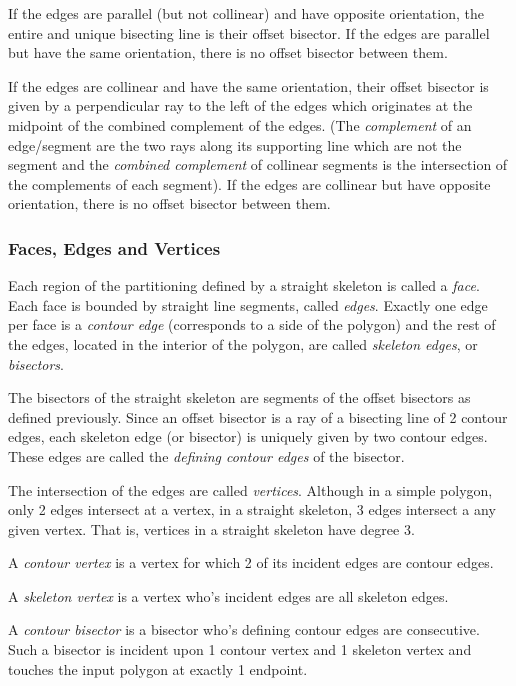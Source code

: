 If the edges are parallel (but not collinear) and have opposite
orientation, the entire and unique bisecting line is their offset
bisector. If the edges are parallel but have the same orientation,
there is no offset bisector between them.

If the edges are collinear and have the same orientation, their offset
bisector is given by a perpendicular ray to the left of the edges
which originates at the midpoint of the combined complement of
the edges. (The {\em complement} of an edge/segment are the two
rays along its supporting line which are not the segment and the
{\em combined complement} of  collinear segments is the
intersection of the complements of each segment). If the edges are
collinear but have opposite orientation, there is no offset bisector
between them.


\subsubsection{Faces, Edges and Vertices}

Each region of the partitioning defined by a straight skeleton is
called a {\em face}. Each face is bounded by straight line segments,
called {\em edges}. Exactly one edge per face is a {\em contour edge}
(corresponds to a side of the polygon) and the rest of the edges,
located in the interior of the polygon, are called {\em skeleton
edges}, or {\em bisectors}.

The bisectors of the straight skeleton are segments of the offset
bisectors as defined previously. Since an offset bisector is a ray of
a bisecting line of 2 contour edges, each skeleton edge (or bisector)
is uniquely given by two contour edges. These edges are called the
{\em defining contour edges} of the bisector.

The intersection of the edges are called {\em vertices}. Although in a
simple polygon, only 2 edges intersect at a vertex, in a straight
skeleton, 3 edges intersect a any given vertex. That is, vertices in a
straight skeleton have degree 3.

A {\em contour vertex} is a vertex for which 2 of its incident edges are contour edges.

A {\em skeleton vertex} is a vertex who's incident edges are all skeleton edges.

A {\em contour bisector} is a bisector who's defining contour edges
are consecutive. Such a bisector is incident upon 1 contour vertex and
1 skeleton vertex and touches the input polygon at exactly 1 endpoint.

